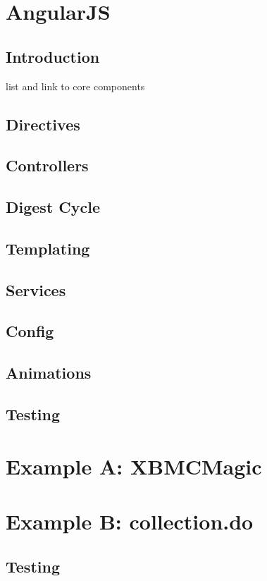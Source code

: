 

\chapter{AngularJS}
\section{Introduction}

list and link to core components

\section{Directives}
\section{Controllers}
\section{Digest Cycle}
\section{Templating}
\section{Services}
\section{Config}
\section{Animations}
\section{Testing}

\chapter{Example A: XBMCMagic}
\label{ch:xbmc}






\chapter{Example B: collection.do}
\label{ch:collection}



\section{Testing}